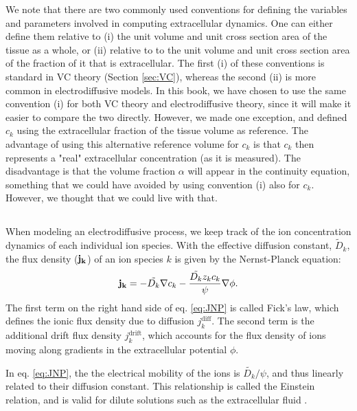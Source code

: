 We note that there are two commonly used conventions for defining the variables and parameters involved in computing extracellular dynamics. One can either define them relative to (i) the unit volume and unit cross section area of the tissue as a whole, or (ii) relative to to the unit volume and unit cross section area of the fraction of it that is extracellular. The first (i) of these conventions is standard in VC theory (Section \ref{sec:VC}), whereas the second (ii) is more common in electrodiffusive models. In this book, we have chosen to use the same convention (i) for both VC theory and electrodiffusive theory, since it will make it easier to compare the two directly. However, we made one exception, and defined $c_k$ using the extracellular fraction of the tissue volume as reference. The advantage of using this alternative reference volume for $c_k$ is that $c_k$ then represents a "real" extracellular concentration (as it is measured). The disadvantage is that the volume fraction $\alpha$ will appear in the continuity equation, something that we could have avoided by using convention (i) also for $c_k$. However, we thought that we could live with that.


\subsection{}
When modeling an electrodiffusive process, we keep track of the ion concentration dynamics of each individual ion species. With the effective diffusion constant, $\tilde{D}_k$, the flux density (${\bf j_k}$) of an ion species $k$ is given by the Nernst-Planck equation:
\begin{equation}
{\bf j_k} = - \tilde{D_k} {\bf \nabla} c_{k} - \frac{\tilde{D_k} z_k c_k}{\psi} {\bf \nabla} \phi.
\label{eq:JNP}
\end{equation}
The first term on the right hand side of eq. \ref{eq:JNP} is called Fick's law, which defines the ionic flux density due to diffusion $j_{k}^\text{diff}$. The second term is the additional drift flux density $j_{k}^\text{drift}$, which accounts for the flux density of ions moving along gradients in the extracellular potential $\phi$.

In eq. \ref{eq:JNP}, the the electrical mobility of the ions is $\tilde{D_k}/\psi$, and thus linearly related to their diffusion constant. This relationship is called the Einstein relation, and is valid for dilute solutions such as the extracellular fluid \cite{Grodzinsky2011}.

